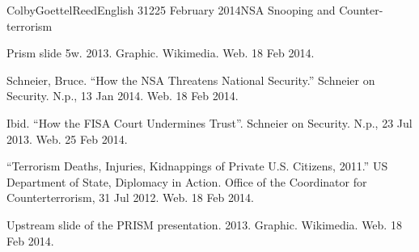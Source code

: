 \documentclass[12pt]{article}
\begin{document}
\begin{mla}{Colby}{Goettel}{Reed}{English 312}{25 February 2014}{NSA Snooping and Counter-terrorism}
\begin{workscited}
    \bibent Prism slide 5w. 2013. Graphic. Wikimedia. Web. 18 Feb 2014.
    
    \bibent Schneier, Bruce. ``How the NSA Threatens National Security.'' Schneier on Security. N.p., 13 Jan 2014. Web. 18 Feb 2014.
    
    \bibent Ibid. ``How the FISA Court Undermines Trust''. Schneier on Security. N.p., 23 Jul 2013. Web. 25 Feb 2014.
        
    \bibent ``Terrorism Deaths, Injuries, Kidnappings of Private U.S. Citizens, 2011.'' US Department of State, Diplomacy in Action. Office of the Coordinator for Counterterrorism, 31 Jul 2012. Web. 18 Feb 2014.
    
    \bibent Upstream slide of the PRISM presentation. 2013. Graphic. Wikimedia. Web. 18 Feb 2014.
\end{workscited}

\end{mla}
\end{document}
